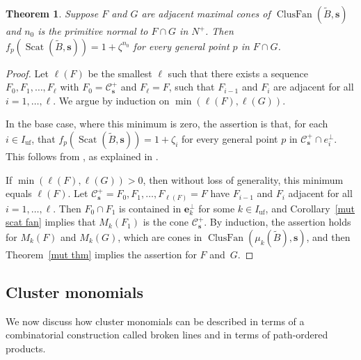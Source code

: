 \documentclass{amsart}
\newtheorem{theorem}[proposition]{Theorem}
\theoremstyle{definition}
\theoremstyle{remark}
\numberwithin{equation}{section}
\newcommand{\uf}{{\operatorname{uf}}}
\newcommand{\0}{{\mathbf{0}}}
\newcommand{\s}{\mathbf{s}}
\newcommand{\e}{\mathbf{e}}
\newcommand{\tB}{\tilde{B}}
\newcommand{\C}{\mathcal{C}}
\newcommand{\Scat}{\operatorname{Scat}}
\newcommand{\ClusFan}{\operatorname{ClusFan}}
\begin{document}
\begin{theorem}\label{clus easy}
Suppose $F$ and $G$ are adjacent maximal cones of $\ClusFan(\tB,\s)$ and $n_0$ is the primitive normal to $F\cap G$ in $N^+$.
Then $f_p(\Scat(\tB,\s))=1+\zeta^{n_0}$ for every general point $p$ in $F\cap G$.
\end{theorem}
\begin{proof}
Let $\ell(F)$ be the smallest $\ell$ such that there exists a sequence $F_0,F_1,\ldots,F_\ell$ with $F_0=\C_\s^+$ and $F_\ell=F$, such that $F_{i-1}$ and $F_i$ are adjacent for all $i=1,\ldots,\ell$.
We argue by induction on $\min(\ell(F),\ell(G))$.

In the base case, where this minimum is zero, the assertion is that, for each $i\in I_\uf$, that $f_p(\Scat(\tB,\s))=1+\zeta_i$ for every general point $p$ in $\C_\s^+\cap e_i^\perp$.
This follows from \cite[Theorem~1.28]{GHKK}, as explained in \cite[Remark~1.29]{GHKK}.

If $\min(\ell(F),\ell(G))>0$, then without loss of generality, this minimum equals $\ell(F)$.
Let $\C_\s^+=F_0,F_1,\ldots,F_{\ell(F)}=F$ have $F_{i-1}$ and $F_i$ adjacent for all $i=1,\ldots,\ell$.
Then $F_0\cap F_1$ is contained in $\e_k^\perp$ for some $k\in I_\uf$, and Corollary~\ref{mut scat fan} implies that $M_k(F_1)$ is the cone $\C_\s^+$.
By induction, the assertion holds for $M_k(F)$ and $M_k(G)$, which are cones in $\ClusFan(\mu_k(\tB),\s)$, and then Theorem~\ref{mut thm} implies the assertion for $F$ and~$G$.
\end{proof}

\subsection{Cluster monomials}\label{broken sec}
We now discuss how cluster monomials can be described in terms of a combinatorial construction called broken lines and in terms of path-ordered products.
\end{document}
